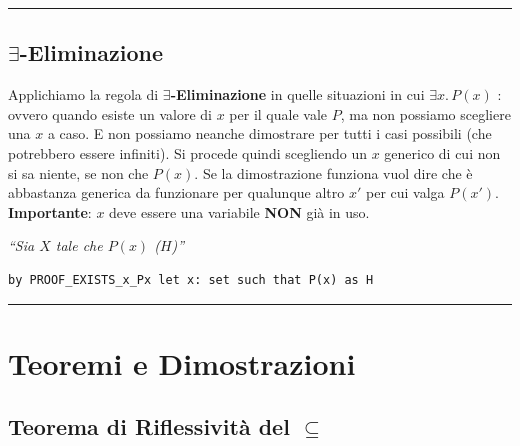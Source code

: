 \documentclass[
  a4paper,
]{article}
\begin{document}
\par\noindent\rule{\linewidth}{0.4pt}\par\vspace{6pt}

\hypertarget{exists-eliminazione}{%
\subsection{\texorpdfstring{\(\exists\)-Eliminazione}{\textbackslash exists-Eliminazione}}\label{exists-eliminazione}}

Applichiamo la regola di \textbf{\(\exists\)-Eliminazione} in quelle
situazioni in cui \(\exists x.\,P(x)\) : ovvero quando esiste un valore
di \(x\) per il quale vale \(P\), ma non possiamo scegliere una \(x\) a
caso. E non possiamo neanche dimostrare per tutti i casi possibili (che
potrebbero essere infiniti). Si procede quindi scegliendo un \(x\)
generico di cui non si sa niente, se non che \(P(x)\). Se la
dimostrazione funziona vuol dire che è abbastanza generica da funzionare
per qualunque altro \(x'\) per cui valga \(P(x')\).\\
\textbf{Importante}: \(x\) deve essere una variabile \textbf{NON} già in
uso.

\begin{examplebox}[Esempio]

\emph{``Sia \(X\) tale che \(P(x)\) (\(H\))''}

\end{examplebox}

\begin{examplebox}

\begin{lstlisting}
by PROOF_EXISTS_x_Px let x: set such that P(x) as H
\end{lstlisting}

\end{examplebox}

\par\noindent\rule{\linewidth}{0.4pt}\par\vspace{6pt}

\newpage

\hypertarget{teoremi-e-dimostrazioni}{%
\section{Teoremi e Dimostrazioni}\label{teoremi-e-dimostrazioni}}

\hypertarget{teorema-di-riflessivituxe0-del-subseteq}{%
\subsection{\texorpdfstring{Teorema di Riflessività del
\(\subseteq\)}{Teorema di Riflessività del \textbackslash subseteq}}\label{teorema-di-riflessivituxe0-del-subseteq}}
\end{document}
